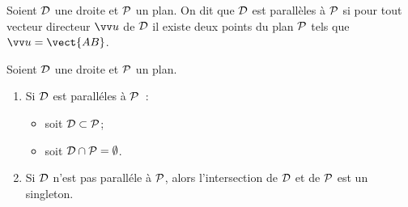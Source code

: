 \begin{defdef}
  Soient $\Dr$ une droite et $\P$ un plan. On dit que $\Dr$ est parallèles à $\P$ si pour tout vecteur directeur $\vu$ de $\Dr$ il existe deux points du plan $\P$ tels que $\vu=\vect{AB}$.
\end{defdef}
\begin{prop}
  Soient $\Dr$ une droite et $\P$ un plan.
  \begin{enumerate}
  \item Si $\Dr$ est paralléles à $\P$~:
    \begin{itemize}
    \item soit $\Dr\subset\P$;
    \item soit $\Dr\cap\P=\emptyset$.
    \end{itemize}
  \item Si $\Dr$ n'est pas paralléle à $\P$, alors l'intersection de $\Dr$ et de $\P$ est un singleton.
  \end{enumerate}
\end{prop}
